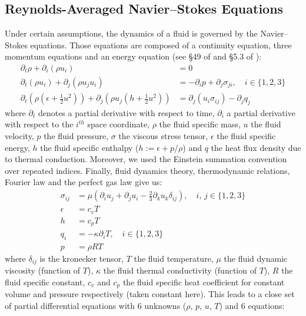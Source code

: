 \begin{subappendices}
	\section{Reynolds-Averaged Navier–Stokes Equations}\label{ap:RANS}
	Under certain assumptions, the dynamics of a fluid is governed by the Navier–Stokes equations. Those equations are composed of a continuity equation, three momentum equations and an energy equation (see §49 of \cite{landau} and §5.3 of \cite{wilcox}):
	\begin{align} \label{eq:NS}
		\partial_t\rho + \partial_i(\rho u_i) &= 0 \\
		\partial_t(\rho u_i) + \partial_j (\rho u_ju_i) &= -\partial_i p + \partial_j\sigma_{ji}, \quad i\in\{1, 2, 3\} \\
		\partial_t\left(\rho \left(\epsilon + \frac{1}{2}u^2\right)\right) + \partial_j \left(\rho u_j \left(h + \frac{1}{2}u^2\right)\right) &= \partial_j(u_i\sigma_{ij}) - \partial_j q_j \label{eq:energy_eq}
	\end{align}
	where $\partial_t$ denotes a partial derivative with respect to time, $\partial_i$ a partial derivative with respect to the $i^{th}$ space coordinate, $\rho$ the fluid specific mass, $u$ the fluid velocity, $p$ the fluid pressure, $\sigma$ the viscous stress tensor, $\epsilon$ the fluid specific energy, $h$ the fluid specific enthalpy ($h := \epsilon + p/\rho$) and $q$ the heat flux density due to thermal conduction. Moreover, we used the Einstein summation convention over repeated indices. Finally, fluid dynamics theory, thermodynamic relations, Fourier law and the perfect gas law give us:
	\begin{align}
		\sigma_{ij} &= \mu \left(\partial_iu_j + \partial_ju_i - \frac{2}{3}\partial_ku_k\delta_{ij}\right), \quad i,\,j\in\{1,2,3\} \\
		\epsilon &= c_v T \\
		h &= c_p T \\
		q_i &= -\kappa\partial_iT, \quad i\in\{1,2,3\} \\
		p &= \rho RT \label{eq:state}
	\end{align}
	where $\delta_{ij}$ is the kronecker tensor, $T$ the fluid temperature, $\mu$ the fluid dynamic viscosity (function of $T$), $\kappa$ the fluid thermal conductivity (function of $T$), $R$ the fluid specific constant, $c_v$ and $c_p$ the fluid specific heat coefficient for constant volume and pressure respectively (taken constant here). This leads to a close set of partial differential equations with 6 unknowns ($\rho$, $p$, $u$, $T$) and 6 equations:

\end{subappendices}
